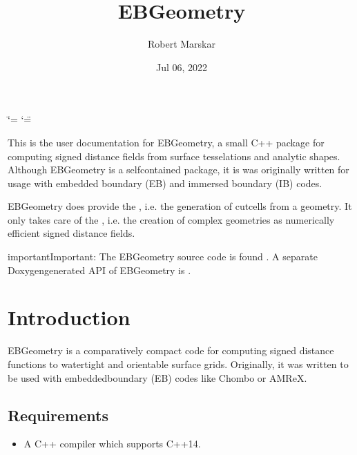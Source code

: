 \documentclass[letterpaper,10pt,english]{sphinxmanual}
\title{EBGeometry}
\date{Jul 06, 2022}
\author{Robert Marskar}
\begin{document}
\ifdefined\shorthandoff
  \ifnum\catcode`\=\string=\active\shorthandoff{=}\fi
  \ifnum\catcode`\"=\active{}\fi
\fi

\pagestyle{empty}
\sphinxmaketitle
\pagestyle{plain}
\sphinxtableofcontents
\pagestyle{normal}
\label{\detokenize{index::doc}}


\sphinxAtStartPar
This is the user documentation for EBGeometry, a small C++ package for computing signed distance fields from surface tesselations and analytic shapes.
Although EBGeometry is a self\sphinxhyphen{}contained package, it is was originally written for usage with embedded boundary (EB) and immersed boundary (IB) codes.

\sphinxAtStartPar
EBGeometry does provide the , i.e. the generation of cut\sphinxhyphen{}cells from a geometry.
It only takes care of the , i.e. the creation of complex geometries as numerically efficient signed distance fields.

\begin{sphinxadmonition}{important}{Important:}
\sphinxAtStartPar
The EBGeometry source code is found .
A separate Doxygen\sphinxhyphen{}generated API of EBGeometry is .
\end{sphinxadmonition}




\chapter{Introduction}
\label{\detokenize{index:introduction}}
\sphinxstepscope
{}\label{\detokenize{Introduction:chap-introduction}}
\sphinxAtStartPar
EBGeometry is a comparatively compact code for computing signed distance functions to watertight and orientable surface grids.
Originally, it was written to be used with embedded\sphinxhyphen{}boundary (EB) codes like Chombo or AMReX.


\section{Requirements}
\label{\detokenize{Introduction:requirements}}\label{\detokenize{Introduction::doc}}\begin{itemize}
\item {} 
\sphinxAtStartPar
A C++ compiler which supports C++14.

\end{itemize}
\end{document}
